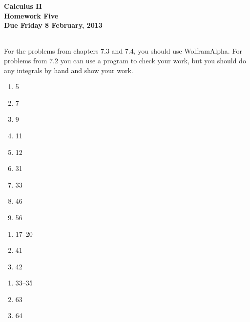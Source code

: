 \documentclass[12pt]{article}
\begin{document}
\pagestyle{empty}
 
\begin{center}
{\large {\bf Calculus II}}\\
\medskip
{\large {\bf Homework Five}}\\
\medskip
{ {\bf Due Friday 8 February, 2013}}\\
\end{center}

\hspace{2mm}\\
   
\noindent For the problems from chapters 7.3 and 7.4, you should use
WolframAlpha. For problems from 7.2 you can use a program to
check your work, but you should do any integrals by hand and show
your work.\\
\hspace{2mm}


\begin{enumerate}
\setlength{\itemsep}{-1mm}
  \item 5
  \item 7
  \item 9
  \item 11
  \item 12
  \item 31
  \item 33
  \item 46
  \item 56
\end{enumerate}


\begin{enumerate}
\setlength{\itemsep}{-1mm}
  \item 17--20
  \item 41
  \item 42
\end{enumerate}



\begin{enumerate}
\setlength{\itemsep}{-1mm}
  \item 33--35
  \item 63
  \item 64
\end{enumerate}
\end{document}

